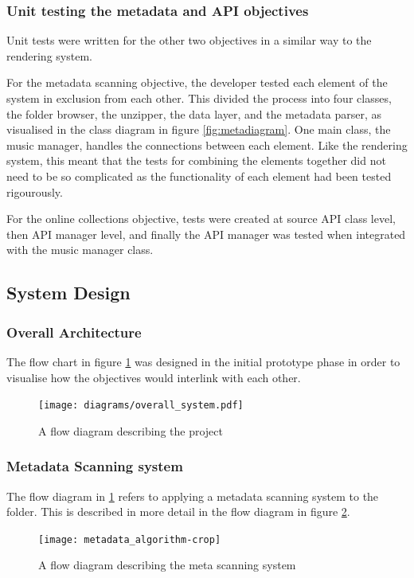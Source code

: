 \subsubsection{Unit testing the metadata and API objectives}
Unit tests were written for the other two objectives in a similar way to the rendering system.

For the metadata scanning objective, the developer tested each element of the system in exclusion from each other. This divided the process into four classes, the folder browser, the unzipper, the data layer, and the metadata parser, as visualised in the class diagram in figure \ref{fig:metadiagram}. One main class, the music manager, handles the connections between each element. Like the rendering system, this meant that the tests for combining the elements together did not need to be so complicated as the functionality of each element had been tested rigourously.

For the online collections objective, tests were created at source API class level, then API manager level, and finally the API manager was tested when integrated with the music manager class.

\subsection{System Design}
\subsubsection{Overall Architecture}
The flow chart in figure \ref{fig:flowchart} was designed in the initial prototype phase in order to visualise how the objectives would interlink with each other.
\begin{figure}[h]
    \centering
    \texttt{[image: diagrams/overall\_system.pdf]}
    \caption{A flow diagram describing the project}
    \label{fig:flowchart}
\end{figure}

\subsubsection{Metadata Scanning system}
The flow diagram in \ref{fig:flowchart} refers to applying a metadata scanning system to the folder. This is described in more detail in the flow diagram in figure \ref{fig:meta}. 
\begin{figure}[H]
    \centering
    \texttt{[image: metadata\_algorithm-crop]}
    \caption{A flow diagram describing the meta scanning system}
    \label{fig:meta}
\end{figure}
